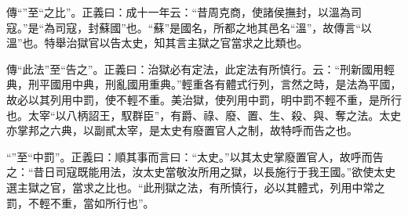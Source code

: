 {\noindent\zhuan{}\fzbyks 傳“”至“之比”。正義曰：成十一年云：“昔周克商，使諸侯撫封，以溫為司寇。”是“為司寇，封蘇國”也。“蘇”是國名，所都之地其邑名“溫”，故傳言“以溫”也。特舉治獄官以告太史，知其言主獄之官當求之比類也。 \par}

{\noindent\zhuan{}\fzbyks 傳“此法”至“告之”。正義曰：治獄必有定法，此定法有所慎行。云：“刑新國用輕典，刑平國用中典，刑亂國用重典。”輕重各有體式行列，言然之時，是法為平國，故必以其列用中罰，使不輕不重。美治獄，使列用中罰，明中罰不輕不重，是所行也。太宰“以八柄詔王，馭群臣”，有爵、祿、廢、置、生、殺、與、奪之法。太史亦掌邦之六典，以副貳太宰，是太史有廢置官人之制，故特呼而告之也。 \par}

{\noindent\shu{}\fzkt “”至“中罰”。正義曰：順其事而言曰：“太史。”以其太史掌廢置官人，故呼而告之：“昔日司寇既能用法，汝太史當敬汝所用之獄，以長施行于我王國。”欲使太史選主獄之官，當求之比也。“此刑獄之法，有所慎行，必以其體式，列用中常之罰，不輕不重，當如所行也”。 \par}

